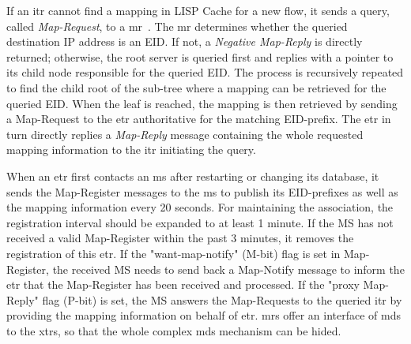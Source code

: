 If an \acrshort{itr} cannot find a mapping in LISP Cache for a new flow, it sends a query, called \emph{Map-Request}, to a \acrshort{mr}~\cite{rfc6833}. The \acrshort{mr} determines whether the queried destination IP address is an EID. If not, a \emph{Negative Map-Reply} is directly returned; otherwise, the root server is queried first and replies with a pointer to its child node responsible for the queried EID. The process is recursively repeated to find the child root of the sub-tree where a mapping can be retrieved for the queried EID. When the leaf is reached, the mapping is then retrieved by sending a Map-Request to the \acrshort{etr} authoritative for the matching EID-prefix. The \acrshort{etr} in turn directly replies a \emph{Map-Reply} message containing the whole requested mapping information to the \acrshort{itr} initiating the query.

When an \acrshort{etr} first contacts an \acrshort{ms} after restarting or changing its database, it sends the Map-Register messages to the \acrshort{ms} to publish its EID-prefixes as well as the mapping information every 20 seconds. For maintaining the association, the registration interval should be expanded to at least 1 minute. If the MS has not received a valid Map-Register within the past 3 minutes, it removes the registration of this \acrshort{etr}. If the "want-map-notify" (M-bit) flag is set in Map-Register, the received MS needs to send back a Map-Notify message to inform the \acrshort{etr} that the Map-Register has been received and processed. If the "proxy Map-Reply" flag (P-bit) is set, the MS answers the Map-Requests to the queried \acrshort{itr} by providing the mapping information on behalf of \acrshort{etr}. \acrshort{mr}s offer an interface of \acrshort{mds} to the \acrshort{xtr}s, so that the whole complex \acrshort{mds} mechanism can be hided.


